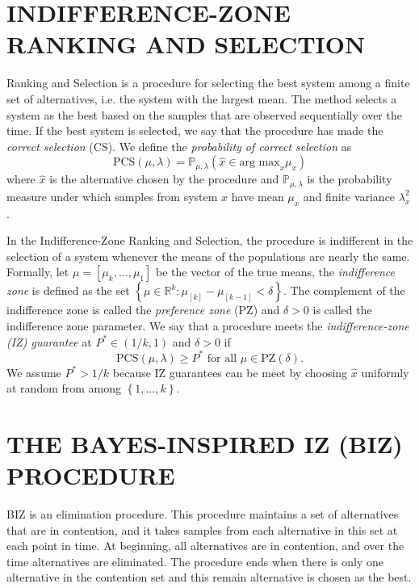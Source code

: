 \documentclass{wscpaperproc}
\theoremstyle{wsc}
\begin{document}
\section{INDIFFERENCE-ZONE RANKING AND SELECTION}

Ranking and Selection is a procedure for selecting the best system
among a finite set of alternatives, i.e. the system with the largest
mean. The method selects a system as the best based on the samples
that are observed sequentially over the time. If the best system is
selected, we say that the procedure has made the \emph{correct selection}
(CS). We define the \emph{probability of correct selection} as 
\[
\mbox{PCS}\left(\mu,\lambda\right)=\mathbb{P}_{\mu,\lambda}\left(\hat{x}\in\mbox{arg max}_{x}\mu_{x}\right)
\]
where $\hat{x}$ is the alternative chosen by the procedure and $\mathbb{P}_{\mu,\lambda}$
is the probability measure under which samples from system $x$ have
mean $\mu_{x}$ and finite variance $\lambda_{x}^{2}$.

In the Indifference-Zone Ranking and Selection, the procedure is indifferent
in the selection of a system whenever the means of the populations
are nearly the same. Formally, let $\mu=\left[\mu_{k},\ldots,\mu_{1}\right]$
be the vector of the true means, the \emph{indifference zone} is defined
as the set $\left\{ \mu\in\mathbb{R}^{k}:\mu_{\left[k\right]}-\mu_{\left[k-1\right]}<\delta\right\} $.
The complement of the indifference zone is called the \emph{preference
zone} (PZ) and $\delta>0$ is called the indifference zone parameter.
We say that a procedure meets the \emph{indifference-zone (IZ) guarantee
}at $P^{*}\in\left(1/k,1\right)$ and $\delta>0$ if
\[
\mbox{PCS}\left(\mu,\lambda\right)\geq P^{*}\mbox{ for all }\mu\in\mbox{PZ}\left(\delta\right).
\]
We assume $P^{*}>1/k$ because IZ guarantees can be meet by choosing
$\hat{x}$ uniformly at random from among $\left\{ 1,\ldots,k\right\} $.

\section{THE BAYES-INSPIRED IZ (BIZ) PROCEDURE}

BIZ is an elimination procedure. This procedure maintains a set of
alternatives that are in contention, and it takes samples from each
alternative in this set at each point in time. At beginning, all alternatives
are in contention, and over the time alternatives are eliminated.
The procedure ends when there is only one alternative in the contention
set and this remain alternative is chosen as the best. 
\end{document}
